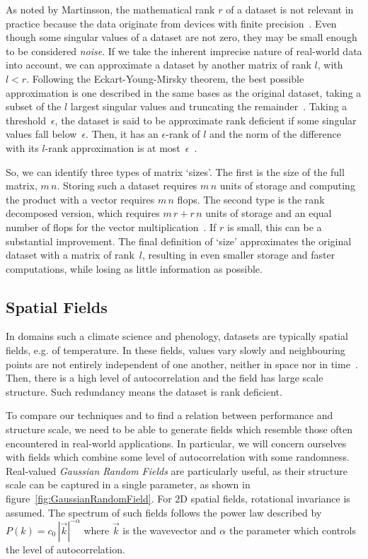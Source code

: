\documentclass[sigconf]{acmart}
\begin{document}
\enlargethispage{2mm}
As noted by Martinsson, the mathematical rank $r$ of a dataset is not relevant in practice because the data originate from devices with finite precision~\cite{Martinsson2016}. Even though some singular values of a dataset are not zero, they may be small enough to be considered \textit{noise}. If we take the inherent imprecise nature of real-world data into account, we can approximate a dataset by another matrix of rank $l$, with $l < r$. Following the Eckart-Young-Mirsky theorem, the best possible approximation is one described in the same bases as the original dataset, taking a subset of the $l$ largest singular values and truncating the remainder~\cite{Eckart1936}. Taking a threshold~$\epsilon$, the dataset is said to be approximate rank deficient if some singular values fall below~$\epsilon$. Then, it has an $\epsilon$-rank of $l$ and the norm of the difference with its $l$-rank approximation is at most~$\epsilon$~\cite{Martinsson2016}.

So, we can identify three types of matrix `sizes'. The first is the size of the full matrix, $m \, n$. Storing such a dataset requires $m \, n$ units of storage and computing the product with a vector requires $m \, n$ flops. The second type is the rank decomposed version, which  requires $m \, r + r \, n$ units of storage and an equal number of flops for the vector multiplication~\cite{Martinsson2016}. If $r$ is small, this can be a substantial improvement. The final definition of `size' approximates the original dataset with a matrix of rank~$l$, resulting in even smaller storage and faster computations, while losing as little information as possible.

\subsection{Spatial Fields}
\label{sec:Introduction Spatial Fields}

In domains such a climate science and phenology, datasets are typically spatial fields, e.g. of temperature. In these fields, values vary slowly and neighbouring points are not entirely independent of one another, neither in space nor in time~\cite{Eshel2011}. Then, there is a high level of autocorrelation and the field has large scale structure. Such redundancy means the dataset is rank deficient.

To compare our techniques and to find a relation between performance and structure scale, we need to be able to generate fields which resemble those often encountered in real-world applications. In particular, we will concern ourselves with fields which combine some level of autocorrelation with some randomness. Real-valued \textit{Gaussian Random Fields} are particularly useful, as their structure scale can be captured in a single parameter, as shown in figure~\ref{fig:GaussianRandomField}. For 2D spatial fields, rotational invariance is assumed. The spectrum of such fields follows the power law described by $P(k) = c_{0} \, |\vec{k}|^{-\alpha}$ where $\vec{k}$ is the wavevector and $\alpha$ the parameter which controls the level of autocorrelation.
\end{document}
